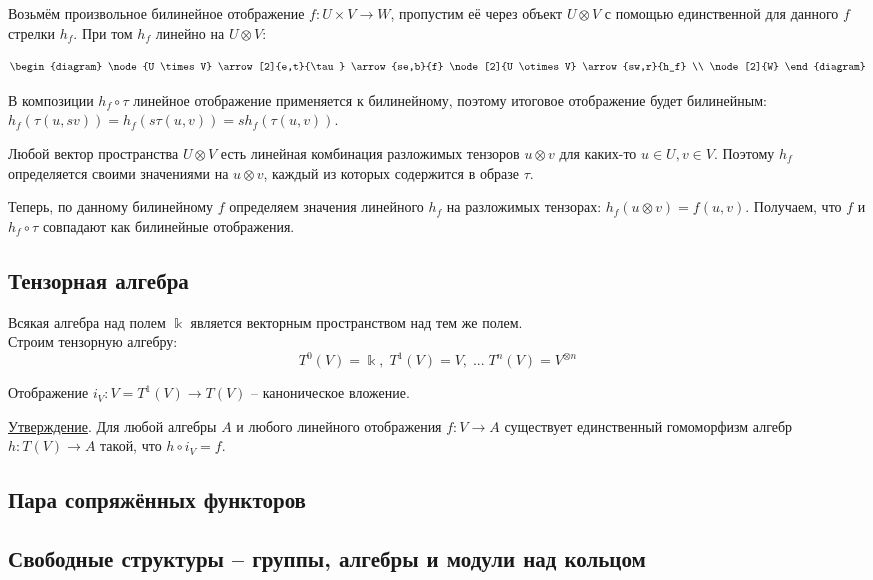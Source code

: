 \documentclass[a4paper, 12pt]{article}
\begin{document}
Возьмём произвольное билинейное отображение $f: U \times V \to W$, пропустим её через объект $U \otimes V$ с помощью единственной для данного $f$ стрелки $h_f$. При 
том $h_f$ линейно на $U \otimes V$:

\[ \begin{diagram}
	\node{U \times V}
		\arrow[2]{e,t}{\tau}
		\arrow{se,b}{f}
	\node[2]{U \otimes V}
		\arrow{sw,r}{h_f}
	\\
	\node[2]{W}	
\end{diagram} \]

В композиции $h_f \circ \tau$ линейное отображение применяется к билинейному, поэтому итоговое отображение будет билинейным: $h_f(\tau(u, sv)) = h_f(s\tau(u, v)) = sh_f(\tau(u, v))$.

Любой вектор пространства $U \otimes V$ есть линейная комбинация разложимых тензоров $u \otimes v$ для каких-то $u \in U, v \in V$. Поэтому $h_f$ определяется своими значениями на $u \otimes v$, каждый из которых содержится в образе $\tau$.

Теперь, по данному билинейному $f$ определяем значения линейного $h_f$ на разложимых тензорах: $h_f(u \otimes v) = f(u, v)$. Получаем, что $f$ и $ h_f \circ \tau$ совпадают как билинейные отображения.


\subsection*{Тензорная алгебра}
Всякая алгебра над полем $\Bbbk$ является векторным пространством над тем же полем.\\
Строим тензорную алгебру:
$$ T^0(V) = \Bbbk, \; T^1(V) = V, \; ... \; T^n(V) = V^{\otimes n} $$

Отображение $i_V: V=T^1(V) \to T(V)$ -- каноническое вложение.

\underline{Утверждение}. Для любой алгебры $A$ и любого линейного отображения $f: V \to A$ существует единственный гомоморфизм алгебр $h: T(V) \to A$ такой, что $h \circ i_V = f$.

\subsection*{Пара сопряжённых функторов}

\subsection*{Свободные структуры -- группы, алгебры и модули над кольцом}
\end{document}
